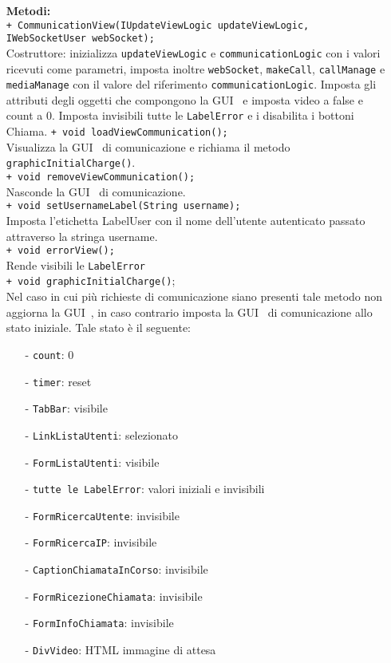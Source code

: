 {\begin{sloppypar}
{\begin{itemize}
\begin{itemize}
			\item[] \textbf{Metodi:}\\
				\texttt{+ CommunicationView(IUpdateViewLogic updateViewLogic, IWebSocketUser webSocket);}\\
				Costruttore: inizializza \texttt{updateViewLogic} e \texttt{communicationLogic} con i valori ricevuti come 
				parametri, imposta inoltre \texttt{webSocket}, \texttt{makeCall}, \texttt{callManage} e 
				\texttt{mediaManage} con il valore del riferimento \texttt{communicationLogic}. Imposta gli 
				attributi degli oggetti che compongono la GUI\g~ e imposta video a false e count a 0. Imposta 
				invisibili tutte le \texttt{LabelError} e i disabilita i bottoni Chiama.
				\texttt{+ void loadViewCommunication();}\\
				Visualizza la GUI\g~ di comunicazione e richiama il metodo \texttt{graphicInitialCharge()}.\\
				\texttt{+ void removeViewCommunication();}\\
				Nasconde la GUI\g~ di comunicazione.\\
				\texttt{+ void setUsernameLabel(String username);}\\
				Imposta l'etichetta LabelUser con il nome dell'utente autenticato passato attraverso la stringa username.\\
				\texttt{+ void errorView();}\\
				Rende visibili le \texttt{LabelError}\\
				\texttt{+ void graphicInitialCharge()};\\
				Nel caso in cui più richieste di comunicazione siano presenti  tale metodo non aggiorna la GUI\g~, in caso 
				contrario imposta la GUI\g~ di comunicazione allo stato iniziale. Tale stato è il seguente:
				\begin{itemize}
					\item[-] \texttt{count}: 0
					\item[-] \texttt{timer}: reset
					\item[-] \texttt{TabBar}: visibile
					\item[-] \texttt{LinkListaUtenti}: selezionato
					\item[-] \texttt{FormListaUtenti}: visibile
					\item[-] \texttt{tutte le LabelError}: valori iniziali e invisibili
					\item[-] \texttt{FormRicercaUtente}: invisibile
					\item[-] \texttt{FormRicercaIP}: invisibile
					\item[-] \texttt{CaptionChiamataInCorso}: invisibile
					\item[-] \texttt{FormRicezioneChiamata}: invisibile
					\item[-] \texttt{FormInfoChiamata}: invisibile
					\item[-] \texttt{DivVideo}: HTML immagine di attesa
				\end{itemize}
		

\end{itemize}
\end{itemize}}
\end{sloppypar}}
